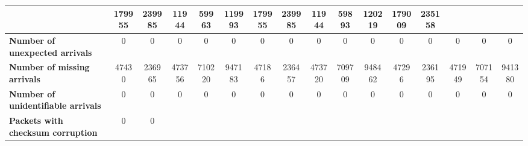 \begin{table}[!h]
{\begin{tabular}{|l|ccccc|ccccc|ccccc|}
            & \multicolumn{1}{c|}{179955}
            & \multicolumn{1}{c|}{239985}
            & \multicolumn{1}{c|}{11944}
            & \multicolumn{1}{c|}{59963}
            & \multicolumn{1}{c|}{119993}
            & \multicolumn{1}{c|}{179955}
            & \multicolumn{1}{c|}{239985}
            & \multicolumn{1}{c|}{11944}
            & \multicolumn{1}{c|}{59893}
            & \multicolumn{1}{c|}{120219}
            & \multicolumn{1}{c|}{179009}
            & \multicolumn{1}{c|}{235158}
            \\ \hline
            \textbf{Number of unexpected arrivals} & \multicolumn{1}{c|}{0} & \multicolumn{1}{c|}{0}
            & \multicolumn{1}{c|}{0}
            & \multicolumn{1}{c|}{0}
            & \multicolumn{1}{c|}{0}
            & \multicolumn{1}{c|}{0}
            & \multicolumn{1}{c|}{0}
            & \multicolumn{1}{c|}{0}
            & \multicolumn{1}{c|}{0}
            & \multicolumn{1}{c|}{0}
            & \multicolumn{1}{c|}{0}
            & \multicolumn{1}{c|}{0}
            & \multicolumn{1}{c|}{0}
            & \multicolumn{1}{c|}{0}
            & \multicolumn{1}{c|}{0}
            \\ \hline
            \textbf{Number of missing arrivals} & \multicolumn{1}{c|}{47430} & \multicolumn{1}{c|}{236965}
            & \multicolumn{1}{c|}{473756}
            & \multicolumn{1}{c|}{710220}
            & \multicolumn{1}{c|}{947183}
            & \multicolumn{1}{c|}{47186}
            & \multicolumn{1}{c|}{236457}
            & \multicolumn{1}{c|}{473720}
            & \multicolumn{1}{c|}{709709}
            & \multicolumn{1}{c|}{948462}
            & \multicolumn{1}{c|}{47296}
            & \multicolumn{1}{c|}{236195}
            & \multicolumn{1}{c|}{471949}
            & \multicolumn{1}{c|}{707154}
            & \multicolumn{1}{c|}{941380}
            \\ \hline
            \textbf{Number of unidentifiable arrivals} & \multicolumn{1}{c|}{0} & \multicolumn{1}{c|}{0}
            & \multicolumn{1}{c|}{0}
            & \multicolumn{1}{c|}{0}
            & \multicolumn{1}{c|}{0}
            & \multicolumn{1}{c|}{0}
            & \multicolumn{1}{c|}{0}
            & \multicolumn{1}{c|}{0}
            & \multicolumn{1}{c|}{0}
            & \multicolumn{1}{c|}{0}
            & \multicolumn{1}{c|}{0}
            & \multicolumn{1}{c|}{0}
            & \multicolumn{1}{c|}{0}
            & \multicolumn{1}{c|}{0}
            & \multicolumn{1}{c|}{0}
            \\ \hline
            \textbf{Packets with checksum corruption} & \multicolumn{1}{c|}{0} & \multicolumn{1}{c|}{0}

\end{tabular}}
\end{table}
